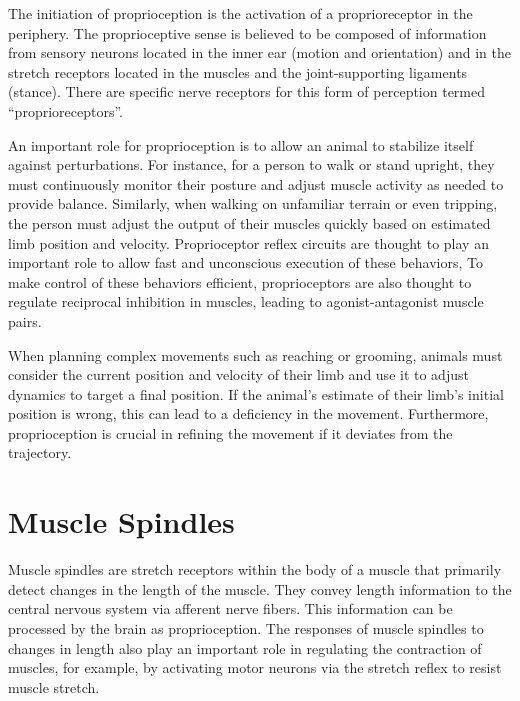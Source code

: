 The initiation of proprioception is the activation of a proprioreceptor in the periphery. The proprioceptive sense is believed to be composed of information from sensory neurons located in the inner ear (motion and orientation) and in the stretch receptors located in the muscles and the joint-supporting ligaments (stance). There are specific nerve receptors for this form of perception termed ``proprioreceptors''.

An important role for proprioception is to allow an animal to stabilize itself against perturbations. For instance, for a person to walk or stand upright, they must continuously monitor their posture and adjust muscle activity as needed to provide balance. Similarly, when walking on unfamiliar terrain or even tripping, the person must adjust the output of their muscles quickly based on estimated limb position and velocity. Proprioceptor reflex circuits are thought to play an important role to allow fast and unconscious execution of these behaviors, To make control of these behaviors efficient, proprioceptors are also thought to regulate reciprocal inhibition in muscles, leading to agonist-antagonist muscle pairs.

When planning complex movements such as reaching or grooming, animals must consider the current position and velocity of their limb and use it to adjust dynamics to target a final position. If the animal's estimate of their limb's initial position is wrong, this can lead to a deficiency in the movement. Furthermore, proprioception is crucial in refining the movement if it deviates from the trajectory.

\hypertarget{muscle-spindles}{%
\section{Muscle Spindles}\label{muscle-spindles}}

Muscle spindles are stretch receptors within the body of a muscle that primarily detect changes in the length of the muscle. They convey length information to the central nervous system via afferent nerve fibers. This information can be processed by the brain as proprioception. The responses of muscle spindles to changes in length also play an important role in regulating the contraction of muscles, for example, by activating motor neurons via the stretch reflex to resist muscle stretch.



